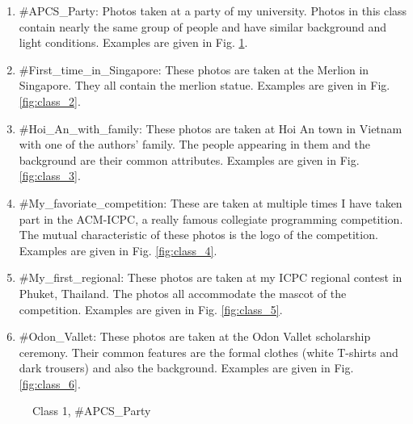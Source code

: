 \begin{enumerate}

\item \#APCS\_Party: Photos taken at a party of my university. Photos in this class contain nearly the same group of people and have similar background and light conditions. Examples are given in Fig. \ref{fig:class_1}.
\item \#First\_time\_in\_Singapore: These photos are taken at the Merlion in Singapore. They all contain the merlion statue. Examples are given in Fig. \ref{fig:class_2}.
\item \#Hoi\_An\_with\_family: These photos are taken at Hoi An town in Vietnam with one of the authors' family. The people appearing in them and the background are their common attributes. Examples are given in Fig. \ref{fig:class_3}.
\item \#My\_favoriate\_competition: These are taken at multiple times I have taken part in the ACM-ICPC, a really famous collegiate programming competition. The mutual characteristic of these photos is the logo of the competition. Examples are given in Fig. \ref{fig:class_4}.
\item \#My\_first\_regional: These photos are taken at my ICPC regional contest in Phuket, Thailand. The photos all accommodate the mascot of the competition. Examples are given in Fig. \ref{fig:class_5}.
\item \#Odon\_Vallet: These photos are taken at the Odon Vallet scholarship ceremony. Their common features are the formal clothes (white T-shirts and dark trousers) and also the background. Examples are given in Fig. \ref{fig:class_6}.

\end{enumerate}

\begin{figure}
    \centering
    \caption{Class 1, \#APCS\_Party}
    \label{fig:class_1}
\end{figure}

